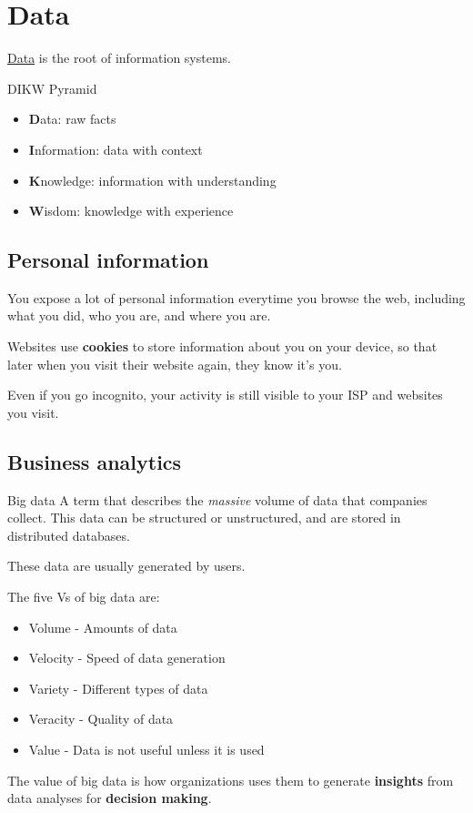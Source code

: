 \section{Data}

\hyperref[def:data]{Data} is the root of information systems.

\begin{definition}
    {DIKW Pyramid}
    \begin{itemize}
        \item \textbf{D}ata: raw facts
        \item \textbf{I}nformation: data with context
        \item \textbf{K}nowledge: information with understanding
        \item \textbf{W}isdom: knowledge with experience
    \end{itemize}
\end{definition}

\subsection{Personal information}

You expose a lot of personal information everytime you browse the web, including what you did, who you are, and where you are.

Websites use \textbf{cookies} to store information about you on your device, so that later when you visit their website again, they know it's you.

Even if you go incognito, your activity is still visible to your ISP and websites you visit.

\subsection{Business analytics}

\begin{definition}
    {Big data}
    A term that describes the \textit{massive} volume of data that companies collect. This data can be structured or unstructured, and are stored in distributed databases.

    These data are usually generated by users.

    The five Vs of big data are:
    \begin{itemize}
        \item Volume - Amounts of data
        \item Velocity - Speed of data generation
        \item Variety - Different types of data
        \item Veracity - Quality of data
        \item Value - Data is not useful unless it is used
    \end{itemize}

    The value of big data is how organizations uses them to generate \textbf{insights} from data analyses for \textbf{decision making}.
\end{definition}

